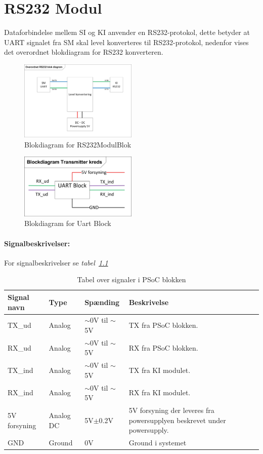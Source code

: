 \chapter{RS232 Modul}
\label{ch:rs232}
Dataforbindelse mellem SI og KI anvender en RS232-protokol, dette betyder at UART signalet fra SM skal level konverteres til RS232-protokol, nedenfor vises det overordnet blokdiagram for RS232 konverteren.
\begin{figure}[H]
\centering
\includegraphics[width=0.5\textwidth]{billeder/RS232ModulBlok}
\caption{Blokdiagram for RS232ModulBlok}
\label{fig:RS232ModulBlok}
\end{figure}


\begin{figure}[H]
\centering
\includegraphics[width=0.5\textwidth]{billeder/uartblock}
\caption{Blokdiagram for Uart Block}
\label{fig:SMUART}
\end{figure}
\subsubsection{Signalbeskrivelser:}
For signalbeskrivelser se \textit{tabel~\ref{table:UARTSignalerSM}}
\begin{table}[H]
\begin{tabular}{|p{3cm}|p{3cm}|p{3cm}|p{4.5cm}|} \hline
\cellcolor[gray]{0.85}Signal navn& \cellcolor[gray]{0.85}Type &\cellcolor[gray]{0.85}Spænding&\cellcolor[gray]{0.85}Beskrivelse\\ \hline
TX\_ud & Analog & $\sim$0V til $\sim$5V & TX fra PSoC blokken.\\ \hline
RX\_ud & Analog & $\sim$0V til $\sim$5V & RX fra PSoC blokken. \\ \hline
TX\_ind & Analog & $\sim$0V til $\sim$5V & TX fra KI modulet.\\ \hline
RX\_ind & Analog & $\sim$0V til $\sim$5V & RX fra KI modulet. \\ \hline
5V forsyning & Analog DC & 5V$\pm$0.2V & 5V forsyning der leveres fra powersupplyen beskrevet under powersupply.\\ \hline
GND & Ground & 0V & Ground i systemet \\ \hline
\end{tabular}
\caption{Tabel over signaler i PSoC blokken}
\label{table:UARTSignalerSM}
\end{table}


